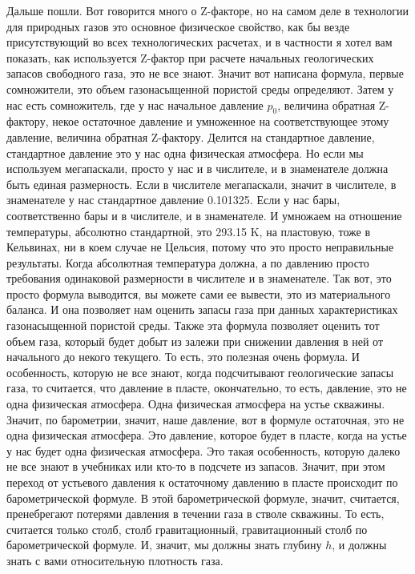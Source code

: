 \documentclass[main.tex]{subfiles}
\begin{document}
Дальше пошли.
Вот говорится много о Z-факторе, но на самом деле в технологии для природных газов это основное физическое свойство, как бы везде присутствующий во всех технологических расчетах, и в частности я хотел вам показать, как используется Z-фактор при расчете начальных геологических запасов свободного газа, это не все знают.
Значит вот написана формула, первые сомножители, это объем газонасыщенной пористой среды определяют.
Затем у нас есть сомножитель, где у нас начальное давление $p_0$, величина обратная Z-фактору, некое остаточное давление и умноженное на соответствующее этому давление, величина обратная Z-фактору.
Делится на стандартное давление, стандартное давление это у нас одна физическая атмосфера.
Но если мы используем мегапаскали, просто у нас и в числителе, и в знаменателе должна быть единая размерность.
Если в числителе мегапаскали, значит в числителе, в знаменателе у нас стандартное давление 0.101325.
Если у нас бары, соответственно бары и в числителе, и в знаменателе.
И умножаем на отношение температуры, абсолютно стандартной, это 293.15 K, на пластовую, тоже в Кельвинах, ни в коем случае не Цельсия, потому что это просто неправильные результаты.
Когда абсолютная температура должна, а по давлению просто требования одинаковой размерности в числителе и в знаменателе.
Так вот, это просто формула выводится, вы можете сами ее вывести, это из материального баланса.
И она позволяет нам оценить запасы газа при данных характеристиках газонасыщенной пористой среды.
Также эта формула позволяет оценить тот объем газа, который будет добыт из залежи при снижении давления в ней от начального до некого текущего.
То есть, это полезная очень формула.
И особенность, которую не все знают, когда подсчитывают геологические запасы газа, то считается, что давление в пласте, окончательно, то есть, давление, это не одна физическая атмосфера.
Одна физическая атмосфера на устье скважины.
Значит, по барометрии, значит, наше давление, вот в формуле остаточная, это не одна физическая атмосфера.
Это давление, которое будет в пласте, когда на устье у нас будет одна физическая атмосфера.
Это такая особенность, которую далеко не все знают в учебниках или кто-то в подсчете из запасов.
Значит, при этом переход от устьевого давления к остаточному давлению в пласте происходит по барометрической формуле.
В этой барометрической формуле, значит, считается, пренебрегают потерями давления в течении газа в стволе скважины.
То есть, считается только столб, столб гравитационный, гравитационный столб по барометрической формуле.
И, значит, мы должны знать глубину $h$, и должны знать с вами относительную плотность газа.
\end{document}
